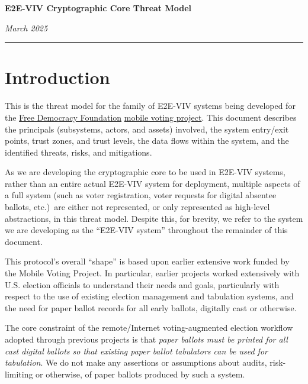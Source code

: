\documentclass[10pt,letterpaper]{article}
\begin{document}
\begin{center}
{\Large \textbf{E2E-VIV Cryptographic Core Threat Model}}
\end{center}
\vspace{-6pt}

 \hspace{\fill} \textit{March 2025}

\vspace{-12pt}

\rule{\textwidth}{1pt}

\tableofcontents

\section*{Introduction}
\label{sec:intro}

This is the threat model for the family of E2E-VIV systems being developed for the \href{https://freedemocracyfoundation.org/}{Free Democracy Foundation} \href{https://mobilevoting.org/}{mobile voting project}. This document describes the principals (subsystems, actors, and assets) involved, the system entry/exit points, trust zones, and trust levels, the data flows within the system, and the identified threats, risks, and mitigations.

As we are developing the cryptographic core to be used in E2E-VIV systems, rather than an entire actual E2E-VIV system for deployment, multiple aspects of a full system (such as voter registration, voter requests for digital absentee ballots, etc.)~are either not represented, or only represented as high-level abstractions, in this threat model. Despite this, for brevity, we refer to the system we are developing as the ``E2E-VIV system'' throughout the remainder of this document.

This protocol's overall ``shape'' is based upon earlier extensive work funded by the Mobile Voting Project. In particular, earlier projects worked extensively with U.S. election officials to understand their needs and goals, particularly with respect to the use of existing election management and tabulation systems, and the need for paper ballot records for all early ballots, digitally cast or otherwise.

The core constraint of the remote/Internet voting-augmented election workflow adopted through previous projects is that \emph{paper ballots must be printed for all cast digital ballots so that existing paper ballot tabulators can be used for tabulation}. We do not make any assertions or assumptions about audits, risk-limiting or otherwise, of paper ballots produced by such a system.
\end{document}
